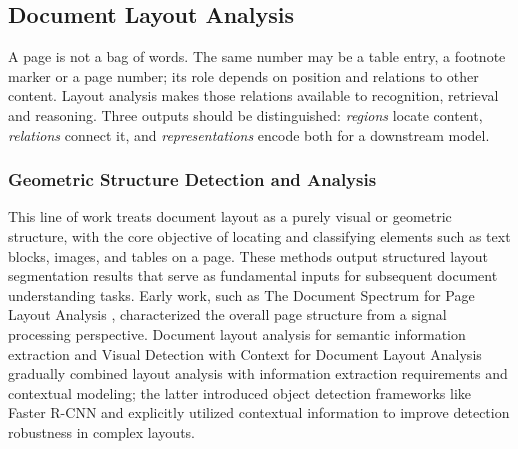 \subsection{Document Layout Analysis}

A page is not a bag of words. The same number may be a table entry, a footnote marker or a page number; its role depends on position and relations to other content. Layout analysis makes those relations available to recognition, retrieval and reasoning. Three outputs should be distinguished: \emph{regions} locate content, \emph{relations} connect it, and \emph{representations} encode both for a downstream model.

\subsubsection{Geometric Structure Detection and Analysis}

This line of work treats document layout as a purely visual or geometric structure, with the core objective of locating and classifying elements such as text blocks, images, and tables on a page. These methods output structured layout segmentation results that serve as fundamental inputs for subsequent document understanding tasks. Early work, such as The Document Spectrum for Page Layout Analysis \cite{ogorman1993documentspectrum}, characterized the overall page structure from a signal processing perspective. Document layout analysis for semantic information extraction \cite{ferrara2017documentlayoutsemantic} and Visual Detection with Context for Document Layout Analysis \cite{soto2019visual} gradually combined layout analysis with information extraction requirements and contextual modeling; the latter introduced object detection frameworks like Faster R-CNN and explicitly utilized contextual information to improve detection robustness in complex layouts.

